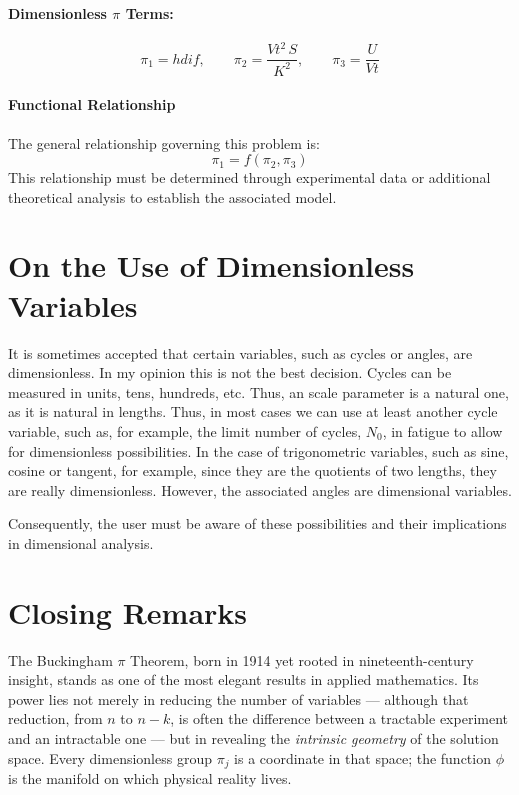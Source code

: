 \paragraph{Dimensionless $\pi$ Terms:}
\begin{equation}
\pi_{1} = hdif, \qquad
\pi_{2} = \frac{Vt^{2} \, S}{K^{2}}, \qquad
\pi_{3} = \frac{U}{Vt}
\end{equation}

\paragraph{Functional Relationship}
The general relationship governing this problem is:
\begin{equation}
\pi_1 = f(\pi_2,\pi_3)
\end{equation}
This relationship must be determined through experimental data or additional theoretical analysis to establish the associated model.

\section{On the Use of Dimensionless Variables}
It is sometimes accepted that certain variables, such as cycles or angles, are dimensionless. In my opinion this is not the best decision. Cycles can be measured in units, tens, hundreds, etc. Thus, an scale parameter is a natural one, as it is natural in lengths. Thus, in most cases we can use at least another cycle variable, such as, for example, the limit number of cycles, $N_0$, in fatigue to allow for dimensionless possibilities. In the case of trigonometric variables, such as sine, cosine or tangent, for example, since they are the quotients of two lengths, they are really dimensionless. However, the associated angles are dimensional variables.

Consequently, the user must be aware of these possibilities and their implications in dimensional analysis.

\section{Closing Remarks}
The Buckingham $\pi$ Theorem, born in 1914 yet rooted in nineteenth-century
insight, stands as one of the most elegant results in applied mathematics.
Its power lies not merely in reducing the number of variables — although that
reduction, from $n$ to $n-k$, is often the difference between a tractable
experiment and an intractable one — but in revealing the \emph{intrinsic geometry}
of the solution space. Every dimensionless group $\pi_j$ is a coordinate in that
space; the function $\phi$ is the manifold on which physical reality lives.

